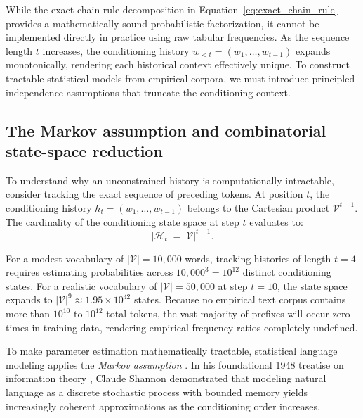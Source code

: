 \documentclass[../../main.tex]{subfiles}
\begin{document}
While the exact chain rule decomposition in Equation~\eqref{eq:exact_chain_rule} provides a mathematically sound probabilistic factorization, it cannot be implemented directly in practice using raw tabular frequencies. As the sequence length $t$ increases, the conditioning history $w_{<t} = (w_1, \dots, w_{t-1})$ expands monotonically, rendering each historical context effectively unique. To construct tractable statistical models from empirical corpora, we must introduce principled independence assumptions that truncate the conditioning context.

\subsection{The Markov assumption and combinatorial state-space reduction}
\label{subsec:markov_assumption}

To understand why an unconstrained history is computationally intractable, consider tracking the exact sequence of preceding tokens. At position $t$, the conditioning history $h_t = (w_1, \dots, w_{t-1})$ belongs to the Cartesian product $\mathcal{V}^{t-1}$. The cardinality of the conditioning state space at step $t$ evaluates to:
\begin{equation}
|\mathcal{H}_t| = |\mathcal{V}|^{t-1}.
\label{eq:unconstrained_history_cardinality}
\end{equation}

For a modest vocabulary of $|\mathcal{V}| = 10{,}000$ words, tracking histories of length $t = 4$ requires estimating probabilities across $10{,}000^3 = 10^{12}$ distinct conditioning states. For a realistic vocabulary of $|\mathcal{V}| = 50{,}000$ at step $t=10$, the state space expands to $|\mathcal{V}|^9 \approx 1.95 \times 10^{42}$ states. Because no empirical text corpus contains more than $10^{10}$ to $10^{12}$ total tokens, the vast majority of prefixes will occur zero times in training data, rendering empirical frequency ratios completely undefined.

To make parameter estimation mathematically tractable, statistical language modeling applies the \textit{Markov assumption} \citep{jurafsky2024}. In his foundational 1948 treatise on information theory \citep{shannon1948}, Claude Shannon demonstrated that modeling natural language as a discrete stochastic process with bounded memory yields increasingly coherent approximations as the conditioning order increases.
\end{document}

